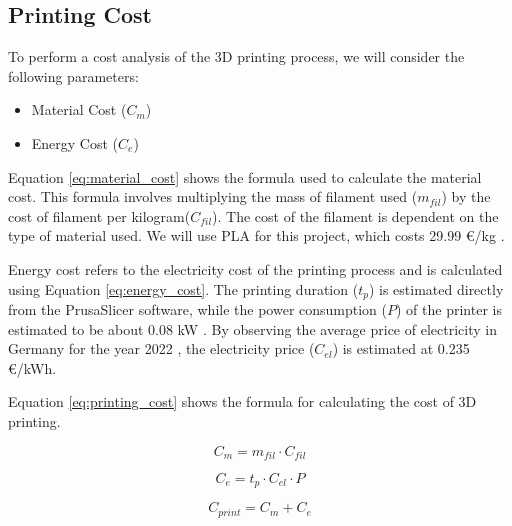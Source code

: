 \subsection{Printing Cost}
\label{subsec:printing_cost}

To perform a cost analysis of the 3D printing process, we will consider the following parameters:

\begin{itemize}
    \item Material Cost ($C_m$)
    \item Energy Cost ($C_e$)
\end{itemize}

Equation \ref{eq:material_cost} shows the formula used to calculate the material cost. This formula involves multiplying the mass of filament used ($m_{fil}$) by the cost of filament per kilogram($C_{fil}$). The cost of the filament is dependent on the type of material used. We will use PLA for this project, which costs 29.99 €/kg \cite{PrusaCost}.

Energy cost refers to the electricity cost of the printing process and is calculated using Equation \ref{eq:energy_cost}. The printing duration ($t_p$) is estimated directly from the PrusaSlicer software, while the power consumption ($P$) of the printer is estimated to be about 0.08 kW \cite{Prusa}. By observing the average price of electricity in Germany for the year 2022 \cite{NordPool}, the electricity price ($C_{el}$) is estimated at 0.235 €/kWh.

Equation \ref{eq:printing_cost} shows the formula for calculating the cost of 3D printing.

\begin{equation}
    \label{eq:material_cost}
    C_{m} = m_{fil}\cdot C_{fil}
\end{equation}

\begin{equation}
    \label{eq:energy_cost}
    C_{e} = t_{p}\cdot C_{el}\cdot P
\end{equation}

\begin{equation}
    \label{eq:printing_cost}
    C_{print} = C_{m} + C_{e}
\end{equation}



